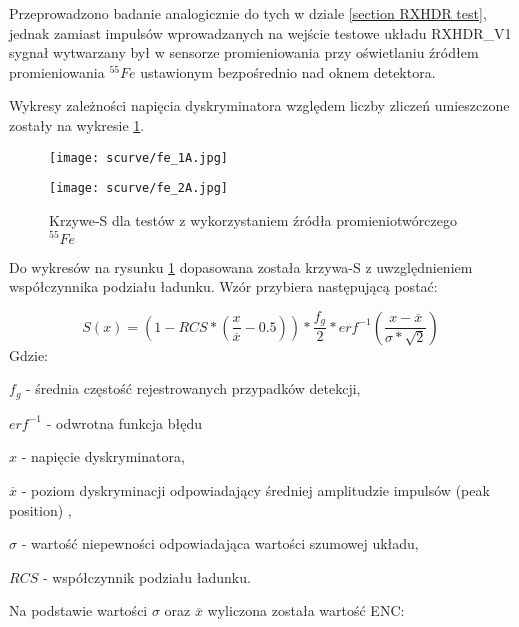 Przeprowadzono badanie analogicznie do tych w dziale \ref{section RXHDR test}, jednak zamiast impulsów wprowadzanych na wejście testowe układu RXHDR\_V1 sygnał wytwarzany był w sensorze promieniowania przy oświetlaniu źródłem promieniowania ${}^{55}Fe$ ustawionym bezpośrednio nad oknem detektora. 

Wykresy zależności napięcia dyskryminatora względem liczby zliczeń umieszczone zostały na wykresie \ref{s curve fe}. 

\begin{figure}[]
        \centering
        \begin{multicols}{2}
                \texttt{[image: scurve/fe\_1A.jpg]} \par
                \texttt{[image: scurve/fe\_2A.jpg]} \par
                
        \end{multicols}
        \caption{Krzywe-S dla testów z wykorzystaniem źródła promieniotwórczego ${}^{55}Fe$}
        \label{s curve fe}
\end{figure}

Do wykresów na rysunku \ref{s curve fe} dopasowana została krzywa-S z uwzględnieniem współczynnika podziału ładunku. Wzór przybiera następującą postać:

\begin{equation}
        \label{test eq}
        S(x) = (1-RCS * (\frac{x}{\overline{x}}-0.5)) * \frac{f_g}{2} * erf^{-1}(\frac{x-\overline{x}}{\sigma*\sqrt{2}})
\end{equation}
Gdzie:
\begin{description}
        \item $f_g$ - średnia częstość rejestrowanych przypadków detekcji,
        \item $erf^{-1}$ - odwrotna funkcja błędu
        \item $x$ - napięcie dyskryminatora,
        \item $\overline{x}$ - poziom dyskryminacji odpowiadający średniej amplitudzie impulsów (peak position) ,
        \item  $\sigma$ - wartość niepewności odpowiadająca wartości szumowej układu,
        \item $RCS$ -  współczynnik podziału ładunku.
\end{description}

Na podstawie wartości $\sigma$ oraz $\overline{x}$ wyliczona została wartość ENC:

